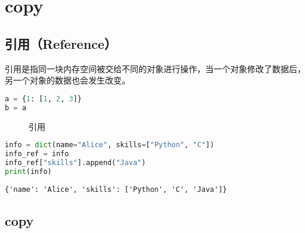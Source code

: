 \newpage

\section{copy}

\subsection{引用（Reference）}

引用是指同一块内存空间被交给不同的对象进行操作，当一个对象修改了数据后，另一个对象的数据也会发生改变。

\vspace{-0.5cm}

\begin{lstlisting}[language=Python]
a = {1: [1, 2, 3]}
b = a
\end{lstlisting}

\begin{figure}[H]
    \centering
    \caption{引用}
\end{figure}

\vspace{0.5cm}


\begin{lstlisting}[language=Python]
info = dict(name="Alice", skills=["Python", "C"])
info_ref = info
info_ref["skills"].append("Java")
print(info)
\end{lstlisting}

\begin{tcolorbox}
    \begin{verbatim}
{'name': 'Alice', 'skills': ['Python', 'C', 'Java']}
\end{verbatim}
\end{tcolorbox}

\vspace{0.5cm}

\subsection{copy}

